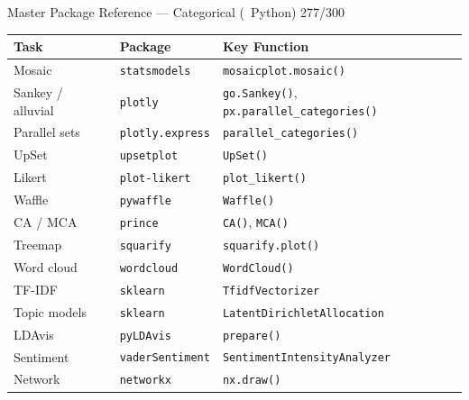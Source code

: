 \documentclass[10pt]{beamer}
\newcommand{\Python}{\textcolor{PyAccent}{\faPython~Python}}
\newcommand{\smark}[1]{\hfill{\scriptsize\color{codegray}#1}}
\begin{document}
\begin{frame}{Master Package Reference --- Categorical (\Python)}
\smark{277/300}
\centering\scriptsize
\begin{tabular}{@{}lll@{}}
    \toprule
    \textbf{Task} & \textbf{Package} & \textbf{Key Function} \\
    \midrule
    Mosaic                   & \texttt{statsmodels}    & \texttt{mosaicplot.mosaic()} \\
    Sankey / alluvial        & \texttt{plotly}         & \texttt{go.Sankey()}, \texttt{px.parallel\_categories()} \\
    Parallel sets            & \texttt{plotly.express} & \texttt{parallel\_categories()} \\
    UpSet                    & \texttt{upsetplot}      & \texttt{UpSet()} \\
    Likert                   & \texttt{plot-likert}    & \texttt{plot\_likert()} \\
    Waffle                   & \texttt{pywaffle}       & \texttt{Waffle()} \\
    CA / MCA                 & \texttt{prince}         & \texttt{CA()}, \texttt{MCA()} \\
    Treemap                  & \texttt{squarify}       & \texttt{squarify.plot()} \\
    Word cloud               & \texttt{wordcloud}      & \texttt{WordCloud()} \\
    TF-IDF                   & \texttt{sklearn}        & \texttt{TfidfVectorizer} \\
    Topic models             & \texttt{sklearn}        & \texttt{LatentDirichletAllocation} \\
    LDAvis                   & \texttt{pyLDAvis}       & \texttt{prepare()} \\
    Sentiment                & \texttt{vaderSentiment} & \texttt{SentimentIntensityAnalyzer} \\
    Network                  & \texttt{networkx}       & \texttt{nx.draw()} \\
    \bottomrule
\end{tabular}
\end{frame}
\end{document}
